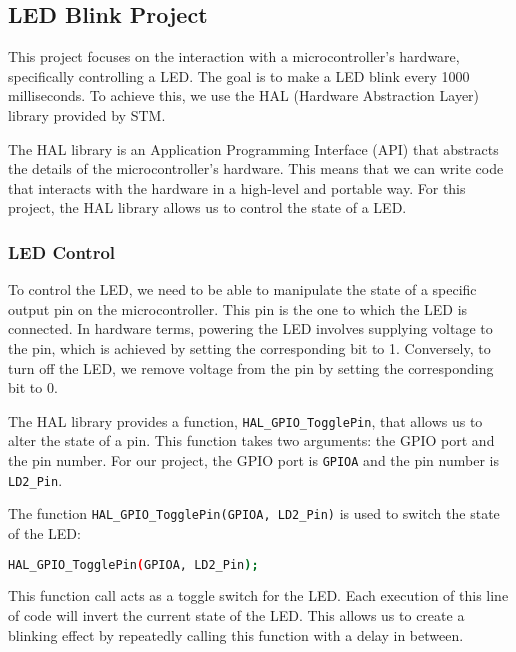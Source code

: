 \subsection{LED Blink Project}

This project focuses on the interaction with a microcontroller's hardware, specifically controlling a LED. The goal is to make a LED blink every 1000 milliseconds. To achieve this, we use the HAL (Hardware Abstraction Layer) library provided by STM.

The HAL library is an Application Programming Interface (API) that abstracts the details of the microcontroller's hardware. This means that we can write code that interacts with the hardware in a high-level and portable way. For this project, the HAL library allows us to control the state of a LED.

\subsubsection{LED Control}

To control the LED, we need to be able to manipulate the state of a specific output pin on the microcontroller. This pin is the one to which the LED is connected. In hardware terms, powering the LED involves supplying voltage to the pin, which is achieved by setting the corresponding bit to 1. Conversely, to turn off the LED, we remove voltage from the pin by setting the corresponding bit to 0.

The HAL library provides a function, \texttt{HAL\_GPIO\_TogglePin}, that allows us to alter the state of a pin. This function takes two arguments: the GPIO port and the pin number. For our project, the GPIO port is \texttt{GPIOA} and the pin number is \texttt{LD2\_Pin}.

The function \texttt{HAL\_GPIO\_TogglePin(GPIOA, LD2\_Pin)} is used to switch the state of the LED:

\begin{codebox}
\begin{lstlisting}[language=bash]
    HAL_GPIO_TogglePin(GPIOA, LD2_Pin);
\end{lstlisting}
\end{codebox}

This function call acts as a toggle switch for the LED. Each execution of this line of code will invert the current state of the LED. This allows us to create a blinking effect by repeatedly calling this function with a delay in between.